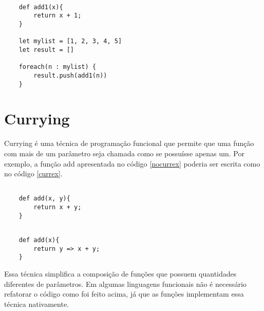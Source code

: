 \begin{lstlisting}[caption={Exemplo sem Funções de Alta Ordem},label=nohof]

    def add1(x){
        return x + 1;
    }

    let mylist = [1, 2, 3, 4, 5]
    let result = []

    foreach(n : mylist) {
        result.push(add1(n))
    }

\end{lstlisting}

\begin{comment}
Talvez a implementação da função map seja parecida 
com a função acima, porém, um programador que não 
conhece o programa levaria muito menos tempo para 
entender a primeira implementação do que a segunda. 
Além disso, para cada função diferente que poderia 
ser aplicada a essa mesma coleção, a mesma 
implementação teria que ser repetida.
\end{comment}



\section{Currying}

Currying é uma técnica de programação funcional que 
permite que uma função com mais de um parâmetro seja 
chamada como se possuísse apenas um\cite{realworldhaskell, functionalscala}. 
Por exemplo, a função add apresentada no código 
\ref{nocurrex} poderia ser escrita como no código 
\ref{currex}.

\begin{lstlisting}[caption={Exemplo sem Currying},label=nocurrex]

    def add(x, y){
        return x + y;
    }

\end{lstlisting}

\begin{lstlisting}[caption={Exemplo de Currying},label=currex]

    def add(x){
        return y => x + y;
    }

\end{lstlisting}

Essa técnica simplifica a composição de funções 
que possuem quantidades diferentes de parâmetros. 
Em algumas linguagens funcionais não é 
necessário refatorar o código como foi feito 
acima, já que as funções implementam essa técnica 
nativamente\cite{realworldhaskell}.



